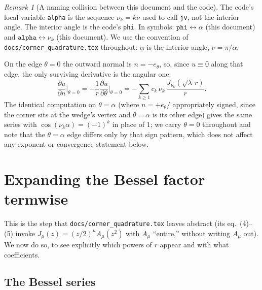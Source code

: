 \documentclass[11pt]{article}
\theoremstyle{remark}
\newtheorem{remark}{Remark}
\newcommand{\pd}[2]{\frac{\partial #1}{\partial #2}}
\newcommand{\pdn}[1]{\frac{\partial #1}{\partial n}}
\newcommand{\code}[1]{\texttt{#1}}
\begin{document}
\begin{remark}[A naming collision between this document and the code]
The code's local variable \code{alpha} is the sequence $\nu_k=k\nu$ used to call \code{jv}, not
the interior angle. The interior angle is the code's \code{phi}. In symbols:
$\code{phi} \leftrightarrow \alpha$ (this document) and $\code{alpha} \leftrightarrow \nu_k$ (this
document). We use the convention of \code{docs/corner\_quadrature.tex} throughout: $\alpha$ is
the interior angle, $\nu=\pi/\alpha$.
\end{remark}

On the edge $\theta=0$ the outward normal is $n=-e_\theta$, so, since $u\equiv0$ along that edge,
the only surviving derivative is the angular one:
\begin{equation}\label{eq:dudn-raw}
  \pdn{u}\bigg|_{\theta=0} = -\frac1r\pd{u}{\theta}\bigg|_{\theta=0}
  = -\sum_{k\ge1} c_k\,\nu_k\,\frac{J_{\nu_k}(\sqrt\lambda\,r)}{r}.
\end{equation}
The identical computation on $\theta=\alpha$ (where $n=+e_\theta/$ appropriately signed, since the
corner sits at the wedge's vertex and $\theta=\alpha$ is its other edge) gives the same series
with $\cos(\nu_k\alpha)=(-1)^k$ in place of $1$; we carry $\theta=0$ throughout and note that the
$\theta=\alpha$ edge differs only by that sign pattern, which does not affect any exponent or
convergence statement below.

\section{Expanding the Bessel factor termwise}\label{sec:bessel}

This is the step that \code{docs/corner\_quadrature.tex} leaves abstract (its eq.~(4)--(5) invoke
$J_\mu(z)=(z/2)^\mu A_\mu(z^2)$ with $A_\mu$ ``entire,'' without writing $A_\mu$ out). We now do
so, to see explicitly which powers of $r$ appear and with what coefficients.

\subsection{The Bessel series}
\end{document}
